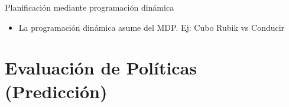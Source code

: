 \documentclass[10pt, envcountsect, handout, aspectratio=1610, hyperref={hypertexnames=true}]{beamer}
\begin{document}
\begin{frame}{Planificación mediante programación dinámica}
\begin{itemize}
\begin{itemize}
\begin{itemize}
    \end{itemize}
    
    \item La programación dinámica asume  del MDP. {\color{reddark} Ej:} Cubo Rubik vs Conducir  
\end{itemize}

\end{itemize}

\end{frame}




\section{Evaluación de Políticas (Predicción)}
\end{document}
